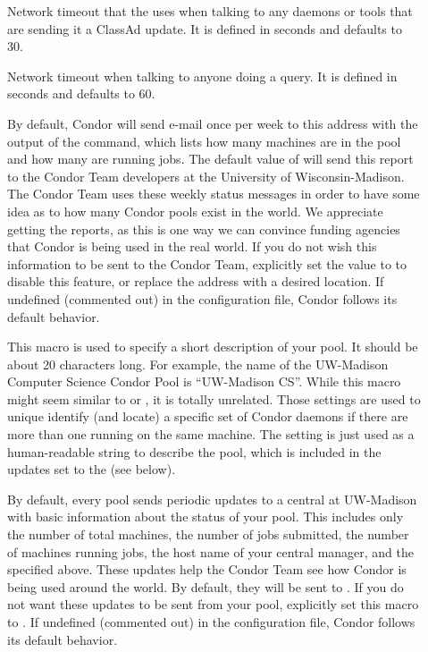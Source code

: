 \begin{description}
\item[] \label{param:ClientTimeout} Network
  timeout that the  uses when talking to any daemons
  or tools that are sending it a ClassAd update.
  It is defined in seconds and defaults to 30.
  
\item[] \label{param:QueryTimeout} Network
  timeout when talking to anyone doing a query. It is defined in seconds
  and defaults to 60.
  
\item[] \label{param:CondorDevelopers}
  By default,
  Condor will send e-mail once per week to this address with the output
  of the  command, which lists how many machines
  are in the pool and how many are running jobs.  The default
  value of  will send this report to
  the Condor Team developers at the University of Wisconsin-Madison.
  The Condor Team uses
  these weekly status messages in order to have some idea as to how
  many Condor pools exist in the world.  We appreciate
  getting the reports, as this is one way we can convince funding
  agencies that Condor is being used in the real world.  
  If you do not wish this information to be sent to the Condor Team,
  explicitly set the value to  to disable this feature,
  or replace the
  address with a desired location.  
  If undefined (commented out) in the configuration file, Condor follows
  its default behavior.

\item[] \label{param:CollectorName}
  This macro is used to specify a short description of your pool.
  It should be about 20 characters long.  For example, the name of the
  UW-Madison Computer Science Condor Pool is ``UW-Madison CS''.  
  While this macro might seem similar to  or
  , it is totally unrelated.
  Those settings are used to unique identify (and locate) a specific
  set of Condor daemons if there are more than one running on the same
  machine.
  The  setting is just used as a
  human-readable string to describe the pool, which is included in the
  updates set to the  (see
  below). 

\item[]
  \label{param:CondorDevelopersCollector} By default, every pool sends
  periodic updates to a central  at UW-Madison with
  basic information about the status of your pool.  This includes only
  the number of total machines, the number of jobs submitted, the
  number of machines running jobs, the host name of your central
  manager, and the  specified above.  These
  updates help the Condor Team see how Condor is being used around the world.
  By default, they will be sent to .
  If you do not want
  these updates to be sent from your pool,
  explicitly set this macro to . 
  If undefined (commented out) in the configuration file, Condor follows
  its default behavior.


\end{description}
